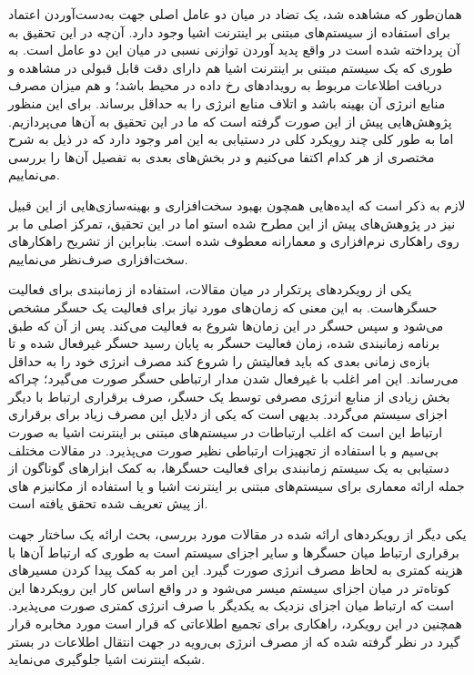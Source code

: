 \par
همان‌طور که مشاهده شد، یک تضاد در میان دو عامل اصلی جهت به‌دست‌آوردن اعتماد برای استفاده از سیستم‌های مبتنی بر اینترنت اشیا وجود دارد. آن‌چه در این تحقیق به آن پرداخته شده است در واقع پدید آوردن توازنی نسبی در میان این دو عامل است. به طوری که یک سیستم مبتنی بر اینترنت اشیا هم دارای دقت قابل قبولی در مشاهده و دریافت اطلاعات مربوط به رویدادهای رخ داده در محیط باشد؛ و هم میزان مصرف منابع انرژی آن بهینه باشد و اتلاف منابع انرژی را به حداقل برساند. برای این منظور پژوهش‌هایی پیش از این صورت گرفته است که ما در این تحقیق به آن‌ها می‌پردازیم. اما به طور کلی چند رویکرد کلی در دستیابی به این امر وجود دارد که در ذیل به شرح مختصری از هر کدام اکتفا می‌کنیم و در بخش‌های بعدی به تفصیل آن‌ها را بررسی می‌نماییم.

\par
لازم به ذکر است که ایده‌هایی همچون بهبود سخت‌افزاری و بهینه‌سازی‌هایی از این قبیل نیز در پژوهش‌های پیش از این مطرح شده استو اما در این تحقیق، تمرکز اصلی ما بر روی راهکاری نرم‌افزاری و معمارانه معطوف شده است. بنابراین از تشریح راهکارهای سخت‌افزاری صرف‌نظر می‌نماییم.

\par
یکی از رویکردهای پرتکرار در میان مقالات، استفاده از زمانبندی برای فعالیت حسگرهاست. به این معنی که زمان‌های مورد نیاز برای فعالیت یک حسگر مشخص می‌شود و سپس حسگر در این زمان‌ها شروع به فعالیت می‌کند. پس از آن که طبق برنامه زمانبندی شده، زمان فعالیت حسگر به پایان رسید حسگر غیرفعال شده و تا بازه‌ی زمانی بعدی که باید فعالیتش را شروع کند مصرف انرژی خود را به حداقل می‌رساند. این امر اغلب با غیرفعال شدن مدار ارتباطی حسگر صورت می‌گیرد؛ چراکه بخش زیادی از منابع انرژی مصرفی توسط یک حسگر، صرف برقراری ارتباط با دیگر اجزای سیستم می‌گردد. بدیهی است که یکی از دلایل این مصرف زیاد برای برقراری ارتباط این است که اغلب ارتباطات در سیستم‌های مبتنی بر اینترنت اشیا به صورت بی‌سیم و با استفاده از تجهیزات ارتباطی نظیر  صورت می‌پذیرد. در مقالات مختلف دستیابی به یک سیستم زمانبندی برای فعالیت حسگرها، به کمک ابزارهای گوناگون از جمله ارائه معماری برای سیستم‌های مبتنی بر اینترنت اشیا و یا استفاده از مکانیزم های از پیش تعریف شده تحقق یافته است.

\par
یکی دیگر از رویکردهای ارائه شده در مقالات مورد بررسی، بحث ارائه یک ساختار جهت برقراری ارتباط میان حسگرها و سایر اجزای سیستم است به طوری که ارتباط آن‌ها با هزینه کمتری به لحاظ مصرف انرژی صورت گیرد. این امر به کمک پیدا کردن مسیرهای کوتاه‌تر در میان اجزای سیستم میسر می‌شود و در واقع اساس کار این رویکردها این است که ارتباط میان اجزای نزدیک به یکدیگر با صرف انرژی کمتری صورت می‌پذیرد. همچنین در این رویکرد، راهکاری برای تجمیع اطلاعاتی که قرار است مورد مخابره قرار گیرد در نظر گرفته شده که از مصرف انرژی بی‌رویه در جهت انتقال اطلاعات در بستر شبکه اینترنت اشیا جلوگیری می‌نماید.

